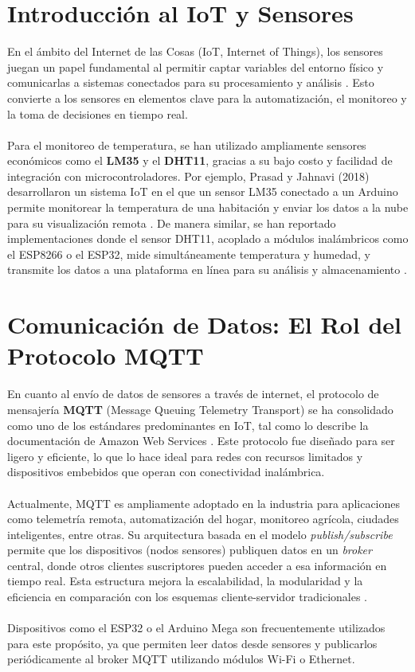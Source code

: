\section{Introducción al IoT y Sensores}
En el ámbito del Internet de las Cosas (IoT, Internet of Things), los sensores juegan un papel fundamental al permitir captar variables del entorno físico y comunicarlas a sistemas conectados para su procesamiento y análisis \cite{webology2018}. Esto convierte a los sensores en elementos clave para la automatización, el monitoreo y la toma de decisiones en tiempo real.
\\\\
Para el monitoreo de temperatura, se han utilizado ampliamente sensores económicos como el \textbf{LM35} y el \textbf{DHT11}, gracias a su bajo costo y facilidad de integración con microcontroladores. Por ejemplo, Prasad y Jahnavi (2018) desarrollaron un sistema IoT en el que un sensor LM35 conectado a un Arduino permite monitorear la temperatura de una habitación y enviar los datos a la nube para su visualización remota \cite{webology2018}. De manera similar, se han reportado implementaciones donde el sensor DHT11, acoplado a módulos inalámbricos como el ESP8266 o el ESP32, mide simultáneamente temperatura y humedad, y transmite los datos a una plataforma en línea para su análisis y almacenamiento \cite{webology2018}.
\section{Comunicación de Datos: El Rol del Protocolo MQTT}
En cuanto al envío de datos de sensores a través de internet, el protocolo de mensajería \textbf{MQTT} (Message Queuing Telemetry Transport) se ha consolidado como uno de los estándares predominantes en IoT, tal como lo describe la documentación de Amazon Web Services \cite{awsMQTT}. Este protocolo fue diseñado para ser ligero y eficiente, lo que lo hace ideal para redes con recursos limitados y dispositivos embebidos que operan con conectividad inalámbrica.
\\\\
Actualmente, MQTT es ampliamente adoptado en la industria para aplicaciones como telemetría remota, automatización del hogar, monitoreo agrícola, ciudades inteligentes, entre otras. Su arquitectura basada en el modelo \textit{publish/subscribe} permite que los dispositivos (nodos sensores) publiquen datos en un \textit{broker} central, donde otros clientes suscriptores pueden acceder a esa información en tiempo real. Esta estructura mejora la escalabilidad, la modularidad y la eficiencia en comparación con los esquemas cliente-servidor tradicionales \cite{awsMQTT}.
\\\\
Dispositivos como el ESP32 o el Arduino Mega son frecuentemente utilizados para este propósito, ya que permiten leer datos desde sensores y publicarlos periódicamente al broker MQTT utilizando módulos Wi-Fi o Ethernet.
